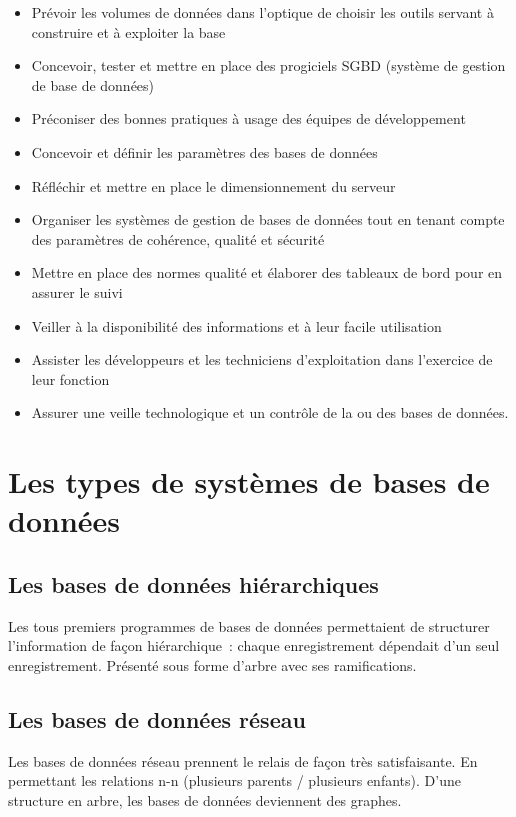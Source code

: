 \documentclass[12pt,a4paper]{report}
\begin{document}
\begin{itemize}[leftmargin=*]
  \item Prévoir les volumes de données dans l'optique de choisir les outils servant
        à construire et à exploiter la base
  \item Concevoir, tester et mettre en place des progiciels SGBD (système de gestion
        de base de données)
  \item Préconiser des bonnes pratiques à usage des équipes de développement
  \item Concevoir et définir les paramètres des bases de données
  \item Réfléchir et mettre en place le dimensionnement du serveur
  \item Organiser les systèmes de gestion de bases de données tout en tenant compte
        des paramètres de cohérence, qualité et sécurité
  \item Mettre en place des normes qualité et élaborer des tableaux de bord pour en
        assurer le suivi
  \item Veiller à la disponibilité des informations et à leur facile utilisation
  \item Assister les développeurs et les techniciens d'exploitation dans l'exercice
        de leur fonction
  \item Assurer une veille technologique et un contrôle de la ou des bases de
        données.
\end{itemize}

\section{Les types de systèmes de bases de données}

\subsection{Les bases de données hiérarchiques}

Les tous premiers programmes de bases de données permettaient de structurer
l'information de façon hiérarchique~: chaque enregistrement dépendait d'un seul
enregistrement. Présenté sous forme d'arbre avec ses ramifications.

\subsection{Les bases de données réseau}

Les bases de données réseau prennent le relais de façon très satisfaisante. En
permettant les relations n-n (plusieurs parents / plusieurs enfants). D'une
structure en arbre, les bases de données deviennent des graphes.
\end{document}
